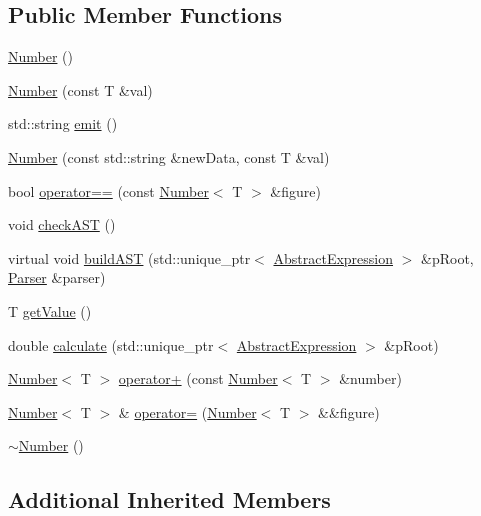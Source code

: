 \subsection*{Public Member Functions}
\begin{DoxyCompactItemize}
\item 
\mbox{\hyperlink{class_number_a6313577241e4023392abfd7d3696f791}{Number}} ()
\item 
\mbox{\hyperlink{class_number_a15c51691afe36b9f0747517b4d322885}{Number}} (const T \&val)
\item 
std\+::string \mbox{\hyperlink{class_number_a0c848cb3dac5685ab08cc382c272b00a}{emit}} ()
\item 
\mbox{\hyperlink{class_number_a4c7243d311175b965fbe32b22980151f}{Number}} (const std\+::string \&new\+Data, const T \&val)
\item 
bool \mbox{\hyperlink{class_number_ad421798cff9c32a4698ccc41bf01643e}{operator==}} (const \mbox{\hyperlink{class_number}{Number}}$<$ T $>$ \&figure)
\item 
void \mbox{\hyperlink{class_number_aa43204ac0f0ddcc95f06e32fa0e3fbf1}{check\+A\+ST}} ()
\item 
virtual void \mbox{\hyperlink{class_number_af80f6bc48cbe13fb075447a0b8eca5f9}{build\+A\+ST}} (std\+::unique\+\_\+ptr$<$ \mbox{\hyperlink{class_abstract_expression}{Abstract\+Expression}} $>$ \&p\+Root, \mbox{\hyperlink{class_parser}{Parser}} \&parser)
\item 
T \mbox{\hyperlink{class_number_a331145d945acc493fd69792e05da9179}{get\+Value}} ()
\item 
double \mbox{\hyperlink{class_number_a870d87540c5e4fc92b061eb11ba1853f}{calculate}} (std\+::unique\+\_\+ptr$<$ \mbox{\hyperlink{class_abstract_expression}{Abstract\+Expression}} $>$ \&p\+Root)
\item 
\mbox{\hyperlink{class_number}{Number}}$<$ T $>$ \mbox{\hyperlink{class_number_a998f98b692e38f912bb8623ed849b46f}{operator+}} (const \mbox{\hyperlink{class_number}{Number}}$<$ T $>$ \&number)
\item 
\mbox{\hyperlink{class_number}{Number}}$<$ T $>$ \& \mbox{\hyperlink{class_number_ab6cca4f8b5b21539b24d431a920c66e6}{operator=}} (\mbox{\hyperlink{class_number}{Number}}$<$ T $>$ \&\&figure)
\item 
\mbox{\hyperlink{class_number_a67c5fc51a64c6ec9438d35c60f17182c}{$\sim$\+Number}} ()
\end{DoxyCompactItemize}
\subsection*{Additional Inherited Members}


